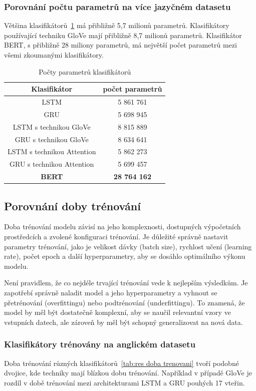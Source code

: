 \subsubsection{Porovnání počtu parametrů na více jazyčném datasetu}
Většina klasifikátorů~\ref{tab:MULTI res pocet parametru} má přibližně 5,7 milionů parametrů.
Klasifikátory používající techniku GloVe mají přibližně 8,7 milionů parametrů.
Klasifikátor BERT, s přibližně 28 miliony parametrů, má největší počet parametrů mezi všemi zkoumanými klasifikátory.

\begin{table}[H]
	\centering
	\caption{Počty parametrů klasifikátorů}\label{tab:MULTI res pocet parametru}
	\begin{tabular}{ c c }
			\toprule
			Klasifikátor & počet parametrů\\
			\midrule
			LSTM & 5 861 761\\
			GRU & 5 698 945\\         
			LSTM s technikou GloVe & 8 815 889\\         
			GRU s technikou GloVe & 8 634 641\\         
			LSTM s technikou Attention & 5 862 273\\         
			GRU s technikou Attention & 5 699 457\\      
			\textbf{BERT} & \textbf{28 764 162}\\         
			\midrule
		\end{tabular}
\end{table}

\subsection{Porovnání doby trénování}
Doba trénování modelu závisí na jeho komplexnosti, dostupných výpočetních prostředcích a zvolené konfiguraci trénování.
Je důležité správně nastavit parametry trénování, jako je velikost dávky (batch size), rychlost učení (learning rate), počet epoch a další hyperparametry, aby se dosáhlo optimálního výkonu modelu.

Není pravidlem, že co nejdéle trvající trénování vede k nejlepším výsledkům.
Je zapotřebí správně naladit model a jeho hyperparametry a vyhnout se přetrénování (overfittingu) nebo podtrénování (underfittingu).
To znamená, že model by měl být dostatečně komplexní, aby se naučil relevantní vzory ve vstupních datech, ale zároveň by měl být schopný generalizovat na nová data.

\subsubsection{Klasifikátory trénovány na anglickém datasetu}\label{subsec:EN cas}
Doba trénování různých klasifikátorů~\ref{tab:res doba trenovani} tvoří podobné dvojice, kde techniky mají blízkou dobu trénování.
Například v případě GloVe je rozdíl v době trénování mezi architekturami LSTM a GRU pouhých 17 vteřin.

